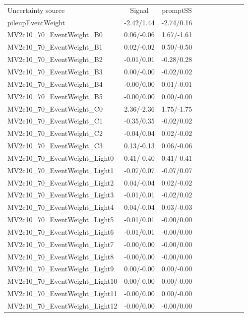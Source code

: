 \begin{table}[h]
\scriptsize
\begin{center}
\begin{tabular}{l|ccccccccc}
\hline
\hline
Uncertainty source &Signal &promptSS \\
pileupEventWeight &-2.42/1.44 &-2.74/0.16 \\
MV2c10\_70\_EventWeight\_B0 &0.06/-0.06 &1.67/-1.61 \\
MV2c10\_70\_EventWeight\_B1 &0.02/-0.02 &0.50/-0.50 \\
MV2c10\_70\_EventWeight\_B2 &-0.01/0.01 &-0.28/0.28 \\
MV2c10\_70\_EventWeight\_B3 &0.00/-0.00 &-0.02/0.02 \\
MV2c10\_70\_EventWeight\_B4 &-0.00/0.00 &0.01/-0.01 \\
MV2c10\_70\_EventWeight\_B5 &-0.00/0.00 &0.00/-0.00 \\
MV2c10\_70\_EventWeight\_C0 &2.36/-2.36 &1.75/-1.75 \\
MV2c10\_70\_EventWeight\_C1 &-0.35/0.35 &-0.02/0.02 \\
MV2c10\_70\_EventWeight\_C2 &-0.04/0.04 &0.02/-0.02 \\
MV2c10\_70\_EventWeight\_C3 &0.13/-0.13 &0.06/-0.06 \\
MV2c10\_70\_EventWeight\_Light0 &0.41/-0.40 &0.41/-0.41 \\
MV2c10\_70\_EventWeight\_Light1 &-0.07/0.07 &-0.07/0.07 \\
MV2c10\_70\_EventWeight\_Light2 &0.04/-0.04 &0.02/-0.02 \\
MV2c10\_70\_EventWeight\_Light3 &-0.01/0.01 &-0.02/0.02 \\
MV2c10\_70\_EventWeight\_Light4 &0.04/-0.04 &0.03/-0.03 \\
MV2c10\_70\_EventWeight\_Light5 &-0.01/0.01 &-0.00/0.00 \\
MV2c10\_70\_EventWeight\_Light6 &-0.01/0.01 &-0.00/0.00 \\
MV2c10\_70\_EventWeight\_Light7 &-0.00/0.00 &-0.00/0.00 \\
MV2c10\_70\_EventWeight\_Light8 &-0.00/0.00 &-0.00/0.00 \\
MV2c10\_70\_EventWeight\_Light9 &0.00/-0.00 &0.00/-0.00 \\
MV2c10\_70\_EventWeight\_Light10 &0.00/-0.00 &0.00/-0.00 \\
MV2c10\_70\_EventWeight\_Light11 &-0.00/0.00 &0.00/-0.00 \\
MV2c10\_70\_EventWeight\_Light12 &-0.00/0.00 &-0.00/0.00 \\

\end{tabular}
\end{center}
\end{table}
